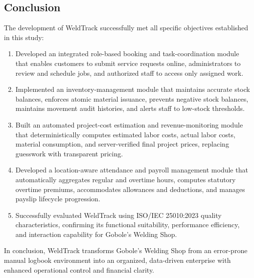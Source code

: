 \documentclass[12pt, letterpaper]{article}
\begin{document}
\subsection{Conclusion}
\hspace*{2em} The development of WeldTrack successfully met all specific objectives established in this study:
\begin{enumerate}[label=\arabic*.]
    \item Developed an integrated role-based booking and task-coordination module that enables customers to submit service requests online, administrators to review and schedule jobs, and authorized staff to access only assigned work.
    \item Implemented an inventory-management module that maintains accurate stock balances, enforces atomic material issuance, prevents negative stock balances, maintains movement audit histories, and alerts staff to low-stock thresholds.
    \item Built an automated project-cost estimation and revenue-monitoring module that deterministically computes estimated labor costs, actual labor costs, material consumption, and server-verified final project prices, replacing guesswork with transparent pricing.
    \item Developed a location-aware attendance and payroll management module that automatically aggregates regular and overtime hours, computes statutory overtime premiums, accommodates allowances and deductions, and manages payslip lifecycle progression.
    \item Successfully evaluated WeldTrack using ISO/IEC 25010:2023 quality characteristics, confirming its functional suitability, performance efficiency, and interaction capability for Gobole's Welding Shop.
\end{enumerate}
\hspace*{2em} In conclusion, WeldTrack transforms Gobole's Welding Shop from an error-prone manual logbook environment into an organized, data-driven enterprise with enhanced operational control and financial clarity.
\end{document}
